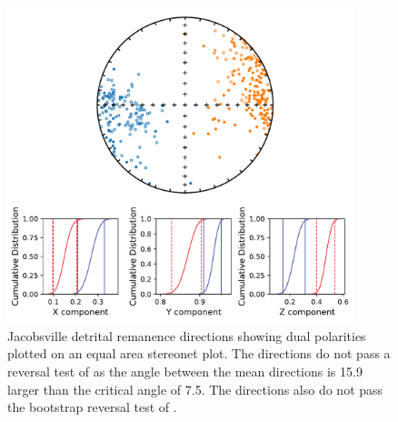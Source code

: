 \begin{figure}
\centering
\includegraphics[width=0.9\textwidth]{figure/Zhang2024a/SI_reversal_test.pdf}
\caption[Paleomagnetic reversal test of the Jacobsville detrital remanence]{Jacobsville detrital remanence directions showing dual polarities plotted on an equal area stereonet plot. The directions do not pass a reversal test of \cite{McFadden1990a} as the angle between the mean directions is 15.9\textdegree\, larger than the critical angle of 7.5\textdegree. The directions also do not pass the bootstrap reversal test of \cite{Tauxe1991a}. }
\label{fig:Jacobsville_reversal_test}
\end{figure}

